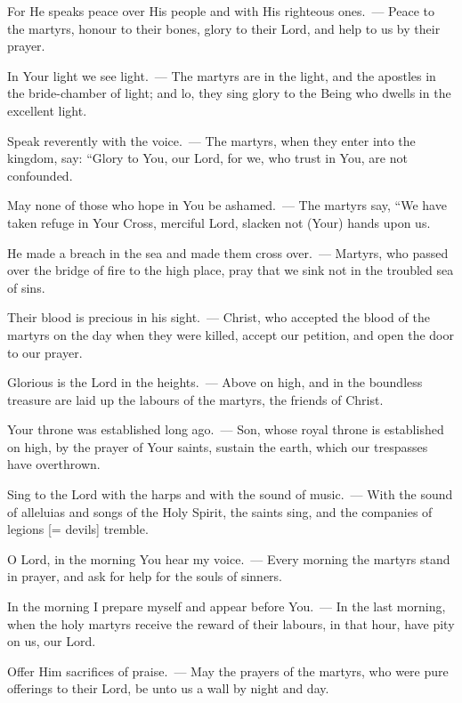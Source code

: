 \documentclass[12pt,twoside,a5paper]{article}
\begin{document}

\begin{halfparskip}
  For He speaks peace over His people and with His righteous ones.~--- Peace to the martyrs, honour to their bones, glory to their Lord, and help to us by their prayer.

  In Your light we see light.~--- The martyrs are in the light, and the apostles in the bride-chamber of light; and lo, they sing glory to the Being who dwells in the excellent light.

  Speak reverently with the voice.~--- The martyrs, when they enter into the kingdom, say: ``Glory to You, our Lord, for we, who trust in You, are not confounded.

  May none of those who hope in You be ashamed.~--- The martyrs say, ``We have taken refuge in Your Cross, merciful Lord, slacken not (Your) hands upon us.

  He made a breach in the sea and made them cross over.~--- Martyrs, who passed over the bridge of fire to the high place, pray that we sink not in the troubled sea of sins.

  Their blood is precious in his sight.~--- Christ, who accepted the blood of the martyrs on the day when they were killed, accept our petition, and open the door to our prayer.

  Glorious is the Lord in the heights.~--- Above on high, and in the boundless treasure are laid up the labours of the martyrs, the friends of Christ.

  Your throne was established long ago.~--- Son, whose royal throne is established on high, by the prayer of Your saints, sustain the earth, which our trespasses have overthrown.

  Sing to the Lord with the harps and with the sound of music.~--- With the sound of alleluias and songs of the Holy Spirit, the saints sing, and the companies of legions [= devils] tremble.

  O Lord, in the morning You hear my voice.~--- Every morning the martyrs stand in prayer, and ask for help for the souls of sinners.

  In the morning I prepare myself and appear before You.~--- In the last morning, when the holy martyrs receive the reward of their labours, in that hour, have pity on us, our Lord.

  Offer Him sacrifices of praise.~--- May the prayers of the martyrs, who were pure offerings to their Lord, be unto us a wall by night and day.


\end{halfparskip}
\end{document}
